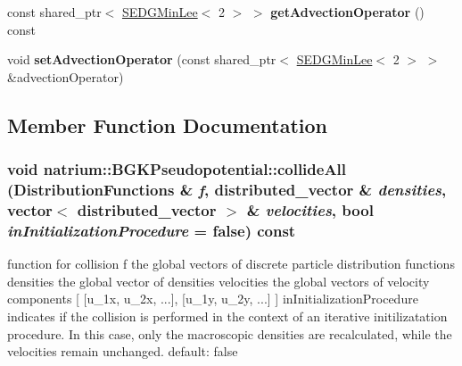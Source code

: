\begin{DoxyCompactItemize}
\item 
\hypertarget{classnatrium_1_1BGKPseudopotential_ab326d9268e46a37af8d0e5ffaaa3efc9}{
const shared\_\-ptr$<$ \hyperlink{classnatrium_1_1SEDGMinLee}{SEDGMinLee}$<$ 2 $>$ $>$ {\bfseries getAdvectionOperator} () const }
\label{classnatrium_1_1BGKPseudopotential_ab326d9268e46a37af8d0e5ffaaa3efc9}

\item 
\hypertarget{classnatrium_1_1BGKPseudopotential_a737f9bbffc442233a0be88caf584c088}{
void {\bfseries setAdvectionOperator} (const shared\_\-ptr$<$ \hyperlink{classnatrium_1_1SEDGMinLee}{SEDGMinLee}$<$ 2 $>$ $>$ \&advectionOperator)}
\label{classnatrium_1_1BGKPseudopotential_a737f9bbffc442233a0be88caf584c088}

\end{DoxyCompactItemize}


\subsection{Member Function Documentation}
\hypertarget{classnatrium_1_1BGKPseudopotential_ac52de8933fa8fbd8a8aa2a3a978f0f4b}{
\subsubsection[{collideAll}]{\setlength{\rightskip}{0pt plus 5cm}void natrium::BGKPseudopotential::collideAll ({\bf DistributionFunctions} \& {\em f}, \/  distributed\_\-vector \& {\em densities}, \/  vector$<$ distributed\_\-vector $>$ \& {\em velocities}, \/  bool {\em inInitializationProcedure} = {\ttfamily false}) const}}
\label{classnatrium_1_1BGKPseudopotential_ac52de8933fa8fbd8a8aa2a3a978f0f4b}


function for collision f the global vectors of discrete particle distribution functions densities the global vector of densities velocities the global vectors of velocity components \mbox{[} \mbox{[}u\_\-1x, u\_\-2x, ...\mbox{]}, \mbox{[}u\_\-1y, u\_\-2y, ...\mbox{]} \mbox{]} inInitializationProcedure indicates if the collision is performed in the context of an iterative initilizatation procedure. In this case, only the macroscopic densities are recalculated, while the velocities remain unchanged. default: false 

